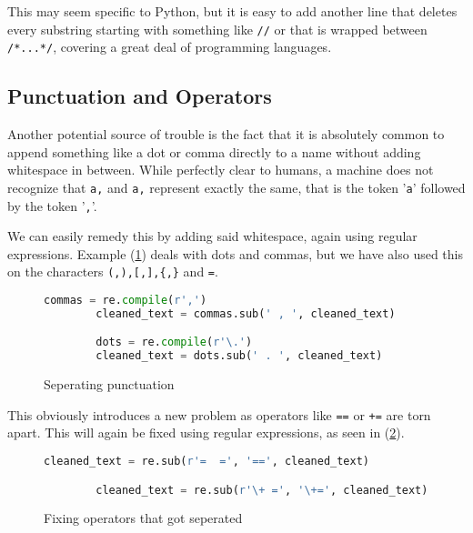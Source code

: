     This may seem specific to Python, but it is easy to add another line
    that deletes every substring starting with something like \verb+//+
    or that is wrapped between \verb+/*...*/+, covering a great deal of
    programming languages.

  \subsection{Punctuation and Operators}
  \label{sub:punctuation_and_operators}

    Another potential source of trouble is the fact that it is
    absolutely common to append something like a dot or comma directly
    to a name without adding whitespace in between. While perfectly
    clear to humans, a machine does not recognize that \verb+a,+ and
    \verb+a+\textvisiblespace\verb+,+ represent exactly the same, that is
    the token '\verb+a+' followed by the token '\verb+,+'.

    We can easily remedy this by adding said whitespace, again using
    regular expressions.  Example (\ref{fig:puncts}) deals with
    dots and commas, but we have also used this on the characters
    \verb+(,),[,],{,}+ and \verb+=+.

    \begin{figure}[htpb]
      \centering \begin{lstlisting}[language=Python]
        commas = re.compile(r',')
        cleaned_text = commas.sub(' , ', cleaned_text)

        dots = re.compile(r'\.') 
        cleaned_text = dots.sub(' . ', cleaned_text) \end{lstlisting} 
        \caption{Seperating punctuation} 
        \label{fig:puncts}
    \end{figure}

    This obviously introduces a new problem as operators like \verb+==+
    or \verb|+=| are torn apart. This will again be fixed using regular expressions,
    as seen in (\ref{fig:operators}).

    \begin{figure}[htpb]
      \centering
      \begin{lstlisting}[language=Python]
        cleaned_text = re.sub(r'=  =', '==', cleaned_text)

        cleaned_text = re.sub(r'\+ =', '\+=', cleaned_text) \end{lstlisting}
      \caption{Fixing operators that got seperated}
      \label{fig:operators}
    \end{figure}

